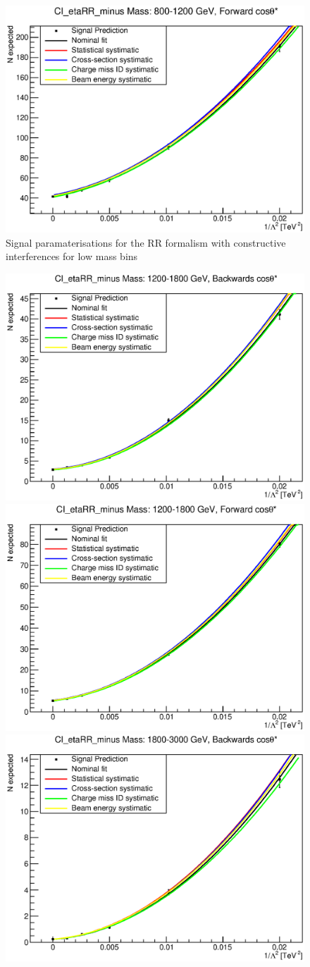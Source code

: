 \begin{figure}[ht]
			\includegraphics[width=0.49\linewidth]{images/thesis_fits/CI_2D_etaRR_minus_Mass_800-1200_GeV_CTS_0_1.eps}
		\caption{Signal paramaterisations for the RR formalism with constructive interferences for low mass bins}
		\label{fig:parm_RR_m_1}
	\end{figure}

	\begin{figure}[ht]
		\centering
			\includegraphics[width=0.49\linewidth]{images/thesis_fits/CI_2D_etaRR_minus_Mass_1200-1800_GeV_CTS_-1_0.eps}
			\includegraphics[width=0.49\linewidth]{images/thesis_fits/CI_2D_etaRR_minus_Mass_1200-1800_GeV_CTS_0_1.eps}
			\includegraphics[width=0.49\linewidth]{images/thesis_fits/CI_2D_etaRR_minus_Mass_1800-3000_GeV_CTS_-1_0.eps}

\end{figure}
